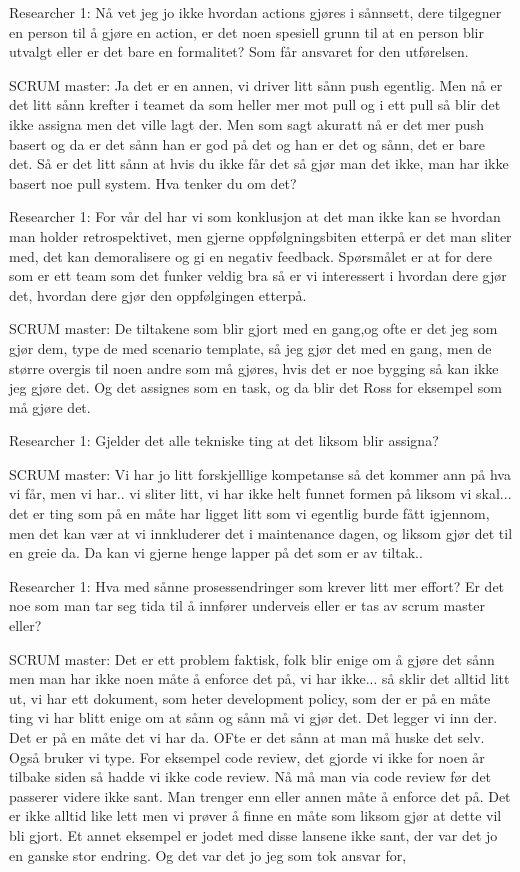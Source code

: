 Researcher 1: Nå vet jeg jo ikke hvordan actions gjøres i sånnsett, dere tilgegner en person til å gjøre en action, er det noen spesiell grunn til at en person blir utvalgt eller er det bare en formalitet?  Som får ansvaret for den utførelsen.

SCRUM master: Ja det er en annen, vi driver litt sånn push egentlig. Men nå er det litt sånn krefter i teamet da som heller mer mot pull og i ett pull så blir det ikke assigna men det ville lagt der. Men som sagt akuratt nå er det mer push basert og da er det sånn han er god på det og han er det og sånn, det er bare det.  Så er det litt sånn at hvis du ikke får det så gjør man det ikke, man har ikke basert noe pull system. Hva tenker du om det?

Researcher 1: For vår del har vi som konklusjon at det man ikke kan se hvordan man holder retrospektivet, men gjerne oppfølgningsbiten etterpå er det man sliter med, det kan demoralisere og gi en negativ feedback. Spørsmålet er at for dere som er ett team som det funker veldig bra så er vi interessert i hvordan dere gjør det, hvordan dere gjør den oppfølgingen etterpå.

SCRUM master: De tiltakene som blir gjort  med en gang,og ofte er det jeg som gjør dem, type de med scenario template, så jeg gjør det med en gang, men de større overgis til noen andre som må gjøres, hvis det er noe bygging så kan ikke jeg gjøre det. Og det assignes som en task, og da blir det Ross for eksempel som må gjøre det.

Researcher 1: Gjelder det alle tekniske ting at det liksom blir assigna?

SCRUM master: Vi har jo litt forskjelllige kompetanse så det kommer ann på hva vi får, men vi har.. vi sliter litt, vi har ikke helt funnet formen på liksom vi skal... det er ting som på en måte har ligget litt som vi egentlig burde fått igjennom, men  det kan vær at vi innkluderer det i maintenance dagen, og liksom gjør det til en greie da. Da kan vi gjerne henge lapper på det som er av tiltak..

Researcher 1: Hva med sånne prosessendringer som krever litt mer effort? Er det noe som man tar seg tida til å innfører underveis eller er tas av scrum master eller?

SCRUM master: Det er ett problem faktisk, folk blir enige om å gjøre det sånn men man har ikke noen måte å enforce det på, vi har ikke... så sklir det alltid litt ut, vi har ett dokument, som heter development policy, som der er på en måte ting vi har blitt enige om at sånn og sånn må vi gjør det. Det legger vi inn der. Det er på en måte det vi har da. OFte er det sånn at man må huske det selv. Også bruker vi type. For eksempel code review, det gjorde vi ikke for noen år tilbake siden så hadde vi ikke code review. Nå må man via code review før det passerer videre ikke sant. Man trenger enn eller annen måte å enforce det på. Det er ikke alltid like lett men vi prøver å finne en måte som liksom gjør at dette vil bli gjort. Et annet eksempel er jodet med disse lansene ikke sant, der var det jo en ganske stor endring. Og det var det jo jeg som tok ansvar for, 

